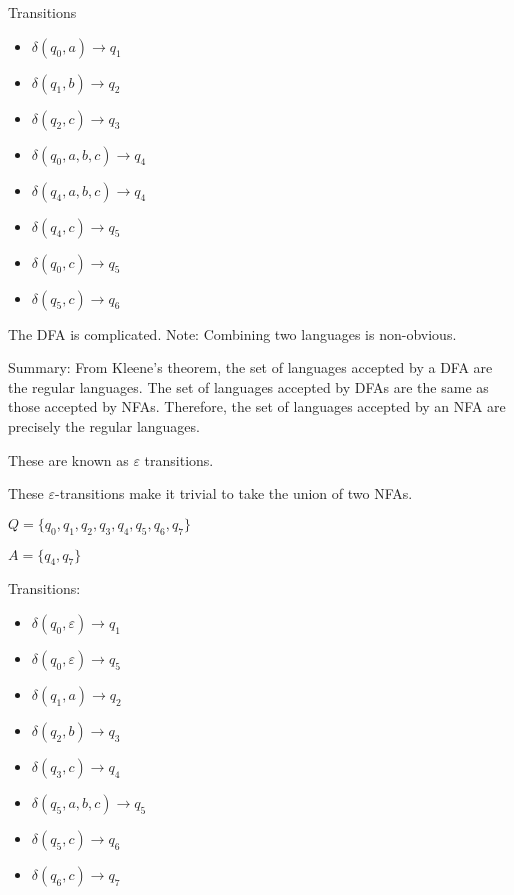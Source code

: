 \documentclass{article}
\begin{document}
Transitions 
\begin{itemize}
    \item \(\delta(q_0, a) \to q_1\)
    \item \(\delta(q_1, b) \to q_2\)
    \item \(\delta(q_2, c) \to q_3\)
    \item \(\delta(q_0, a,b,c) \to q_4\)
    \item \(\delta(q_4, a,b,c) \to q_4\)
    \item \(\delta(q_4, c) \to q_5\)
    \item \(\delta(q_0, c) \to q_5\)
    \item \(\delta(q_5, c) \to q_6\)
\end{itemize}


The DFA is complicated. Note: Combining two languages is non-obvious.

Summary: From Kleene's theorem, the set of languages accepted by a DFA
are the regular languages. The set of languages accepted by DFAs are the
same as those accepted by NFAs. Therefore, the set of languages accepted
by an NFA are precisely the regular languages.


These are known as \(\varepsilon\) transitions.


These \(\varepsilon\)-transitions make it trivial to take the union of
two NFAs.

\(Q = \{q_0,q_1,q_2,q_3,q_4,q_5,q_6,q_7\}\)

\(A = \{q_4, q_7\}\)

Transitions:
\begin{itemize}
    \item \(\delta(q_0, \varepsilon) \to q_1\)
    \item \(\delta(q_0, \varepsilon) \to q_5\)
    \item \(\delta(q_1, a) \to q_2\)
    \item \(\delta(q_2, b) \to q_3\)
    \item \(\delta(q_3, c) \to q_4\)
    \item \(\delta(q_5, a,b,c) \to q_5\)
    \item \(\delta(q_5, c) \to q_6\)
    \item \(\delta(q_6, c) \to q_7\)
\end{itemize}
\end{document}
